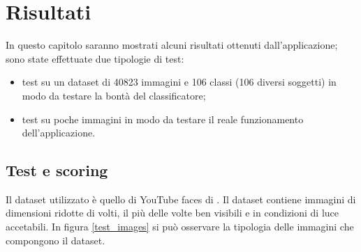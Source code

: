 \chapter{Risultati}
In questo capitolo saranno mostrati alcuni risultati ottenuti dall'applicazione;
sono state effettuate due tipologie di test:
\begin{itemize}
	\item test su un dataset di 40823 immagini e 106 classi (106 diversi soggetti) in modo da testare la bontà del classificatore;
	\item test su poche immagini in modo da testare il reale funzionamento dell'applicazione.
\end{itemize}

\section{Test e scoring}
Il dataset utilizzato è quello di YouTube faces di \cite{wolf2011face}. Il dataset contiene immagini di dimensioni ridotte di volti, il più delle volte ben visibili e in condizioni di luce accetabili. In figura \ref{test_images} si può osservare la tipologia delle immagini che compongono il dataset. 

